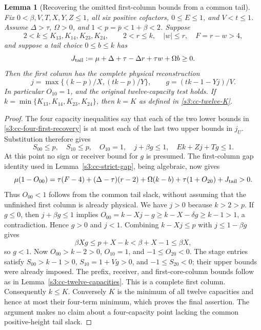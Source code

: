 \documentclass[11pt,reqno]{amsart}
\newtheorem{lemma}[theorem]{Lemma}
\theoremstyle{definition}
\theoremstyle{remark}
\begin{document}
\begin{lemma}[Recovering the omitted first-column bounds from a common tail]
\label{s3:cc-four-recovery}
Fix \(0<\beta,V,T,X,Y,Z\le1\), all six positive cofactors,
\(0\le E\le1\), and \(V<t\le1\). Assume
\(\Delta>\tau\), \(\Omega>0\), and
\(1<p=\bar p<1+\beta<2\).
Suppose
\[
 2<k\le K_{13},K_{14},K_{23},K_{24},\qquad
 2<r\le k,\quad |w|\le r,\quad F=r-w>4,
\]
and suppose a tail choice \(0\le b\le k\) has
\begin{equation}\label{s3:cc-formal-tail-slack}
 J_{\rm tail}:=\mu+\Delta+\tau-\Delta r+\tau w+\Omega b\ge0.
\end{equation}
Then the first column has the complete physical reconstruction
\begin{equation}\label{s3:cc-four-first-recovery}
 j=\max\{(k-p)/X,(tk-p)/Y\},\qquad
 g=(tk-1-Yj)/V.
\end{equation}
In particular \(O_{10}=1\), and the original twelve-capacity
test holds. If \(k=\min\{K_{13},K_{14},K_{23},K_{24}\}\),
then \(k=K\) as defined in \eqref{s3:cc-twelve-K}.
\end{lemma}
\begin{proof}
The four capacity inequalities say that each of the two lower bounds
in \eqref{s3:cc-four-first-recovery} is at most each of the last
two upper bounds in \(j_U\). Substitution therefore gives
\[
 S_{00}\le p,\quad S_{10}\le p,\quad O_{10}=1,
 \quad j+\beta g\le1,\quad Ek+Zj+Tg\le1.
\]
At this point no sign or receiver bound for \(g\) is presumed.
The first-column gap identity used in
Lemma~\ref{s3:cc-strict-gap}, being algebraic, now gives
\[
 \mu(1-O_{00})=\tau(F-4)+(\Delta-\tau)(r-2)
       +\Omega(k-b)+\tau(1+O_{20})+J_{\rm tail}>0.
\]
Thus \(O_{00}<1\) follows from the common tail slack, without
assuming that the unfinished first column is already physical.
We have \(j>0\) because \(k>2>p\). If \(g\le0\), then
\(j+\beta g\le1\) implies
\(O_{00}=k-Xj-g\ge k-X-\delta g\ge k-1>1\), a contradiction.
Hence \(g>0\) and \(j<1\).
Combining \(k-Xj\le p\) with \(j\le1-\beta g\) gives
\[
 \beta Xg\le p+X-k<\beta+X-1\le\beta X,
\]
so \(g<1\). Now \(O_{00}>k-2>0\), \(O_{10}=1\),
and \(-1\le O_{20}<0\). The stage entries satisfy
\(S_{00}>k-1>0\), \(S_{10}=1+Vg>0\), and
\(-1\le S_{20}<0\); their upper bounds were already imposed.
The prefix, receiver, and first-core-column bounds follow as in
Lemma~\ref{s3:cc-twelve-capacities}. This is a complete first column.
Consequently \(k\le K\). Conversely \(K\) is the minimum of
all twelve capacities and hence at most their four-term minimum,
which proves the final assertion. The argument makes no claim about
a four-capacity point lacking the common positive-height tail slack.
\end{proof}
\end{document}
